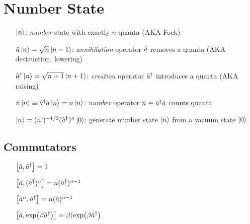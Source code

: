 \section*{Number State}
\begin{itemize}
\item [$\ket{n}$:] \emph{number} state with exactly $n$ quanta (AKA Fock)
\item [$\hat{a}\ket{n} = \sqrt{n}\ket{n-1}$:] \emph{annihilation}
  operator $\hat{a}$ removes a quanta
  (AKA destruction, lowering)
\item [${\hat{a}}^\dagger\ket{n} = \sqrt{n+1}\ket{n+1}$:] \emph{creation}
  operator ${\hat{a}}^\dagger$ introduces a quanta
  (AKA raising)
\item [$\hat{n}\ket{n} \equiv {\hat{a}}^\dagger\hat{a}\ket{n} =
  n\ket{n}$:] \emph{number} operator $\hat{n} \equiv {\hat{a}}^\dagger\hat{a}$ counts quanta
\item [$\ket{n} = (n!)^{-1/2} ({\hat{a}}^\dagger)^n\ket{0}$:] generate number
state $\ket{n}$ from a vacuum state $\ket{0}$
\end{itemize}

\subsection*{Commutators}
\begin{itemize}
\item [$\commutator{\qOpAnnihilation}{\qOpCreation} = 1$]
\item [$\commutator{\qOpAnnihilation}{(\qOpCreation)^n} =
  n(\qOpAnnihilation^\dagger)^{n-1}$] 
\item [$\commutator{\qOpAnnihilation^n}{\qOpCreation} =
  n(\qOpAnnihilation)^{n-1}$] 
\item [$\commutator{\qOpAnnihilation}{\exp(\beta\qOpCreation)} =
  \beta(\exp(\beta\qOpCreation)$]  
\end{itemize} 